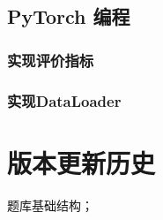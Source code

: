 \documentclass[cn,10pt,math=newtx,citestyle=gb7714-2015,bibstyle=gb7714-2015]{elegantbook}
\begin{document}
\section{PyTorch 编程}

\subsection{实现评价指标}

\subsection{实现DataLoader}

\chapter{版本更新历史}


\begin{change}
  \item 题库基础结构；
\end{change}

\nocite{*} 
\printbibliography
\appendix
\end{document}
